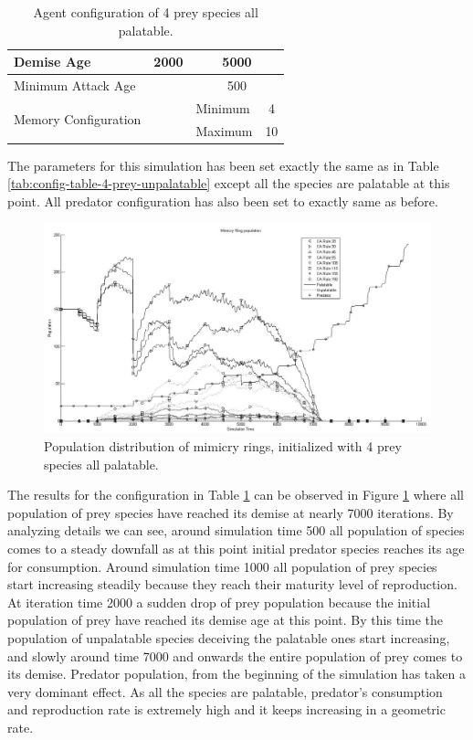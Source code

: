 \begin{table}[H]
\begin{tabular}{|l|l|c|c|l|c|}
  Demise Age	 									 & \multicolumn{3}{|c|}{2000}							& \multicolumn{2}{|c|}{5000} \\ \hline
  Minimum Attack Age						 & \multicolumn{3}{|c|}{} 						    & \multicolumn{2}{|c|}{500} \\ \hline
  \multirow{2}{*}{Memory Configuration} & \multicolumn{3}{|c|}{} 					& Minimum & 4 \\ \cline{5-6}
   																			& \multicolumn{3}{|c|}{} 					& Maximum & 10 \\ \hline  
\end{tabular}
\caption{Agent configuration of 4 prey species all palatable.}
\label{tab:config-table-4-prey-palatable}
\end{table}

The parameters for this simulation has been set exactly the same as in Table \ref{tab:config-table-4-prey-unpalatable} except all the species are palatable at this point. All predator configuration has also been set to exactly same as before.

\begin{figure}[H]
	\centering
	\includegraphics[scale=0.40]{images/simTime-9k-4Prey-p}
	\caption[Population distribution of mimicry rings (4 prey species all palatable)]{Population distribution of mimicry rings, initialized with 4 prey species all palatable.}
	\label{fig:plot-4-prey-p}
\end{figure}

The results for the configuration in Table \ref{tab:config-table-4-prey-palatable} can be observed in Figure \ref{fig:plot-4-prey-p} where all population of prey species have reached its demise at nearly 7000 iterations. By analyzing details we can see, around simulation time 500 all population of species comes to a steady downfall as at this point initial predator species reaches its age for consumption. Around simulation time 1000 all population of prey species start increasing steadily because they reach their maturity level of reproduction. At iteration time 2000 a sudden drop of prey population because the initial population of prey have reached its demise age at this point. By this time the population of unpalatable species deceiving the palatable ones start increasing, and slowly around time 7000 and onwards the entire population of prey comes to its demise. Predator population, from the beginning of the simulation has taken a very dominant effect. As all the species are palatable, predator's consumption and reproduction rate is extremely high and it keeps increasing in a geometric rate.

